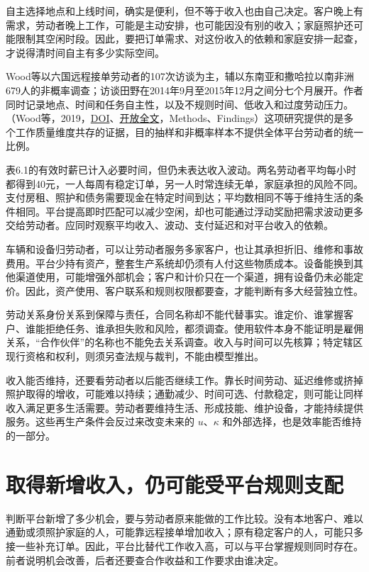 \documentclass[UTF8,fontset=windows,12pt,a4paper,oneside,openany]{ctexbook}
\begin{document}
自主选择地点和上线时间，确实是便利，但不等于收入也由自己决定。客户晚上有需求，劳动者晚上工作，可能是主动安排，也可能因没有别的收入；家庭照护还可能限制其空闲时段。因此，要把订单需求、对这份收入的依赖和家庭安排一起查，才说得清时间自主有多少实际空间。

Wood等以六国远程接单劳动者的107次访谈为主，辅以东南亚和撒哈拉以南非洲679人的非概率调查；访谈田野在2014年9月至2015年12月之间分七个月展开。作者同时记录地点、时间和任务自主性，以及不规则时间、低收入和过度劳动压力。（Wood等，2019，\href{https://doi.org/10.1177/0950017018785616}{DOI}、\href{https://pmc.ncbi.nlm.nih.gov/articles/PMC6380453/}{开放全文}，Methods、Findings）这项研究提供的是多个工作质量维度共存的证据，目的抽样和非概率样本不提供全体平台劳动者的统一比例。

表6.1的有效时薪已计入必要时间，但仍未表达收入波动。两名劳动者平均每小时都得到40元，一人每周有稳定订单，另一人时常连续无单，家庭承担的风险不同。支付房租、照护和债务需要现金在特定时间到达；平均数相同不等于维持生活的条件相同。平台提高即时匹配可以减少空闲，却也可能通过浮动奖励把需求波动更多交给劳动者。应同时观察平均收入、波动、支付延迟和对平台收入的依赖。

车辆和设备归劳动者，可以让劳动者服务多家客户，也让其承担折旧、维修和事故费用。平台少持有资产，整套生产系统却仍须有人付这些物质成本。设备能换到其他渠道使用，可能增强外部机会；客户和计价只在一个渠道，拥有设备仍未必能定价。因此，资产使用、客户联系和规则权限都要查，才能判断有多大经营独立性。

劳动关系身份关系到保障与责任，合同名称却不能代替事实。谁定价、谁掌握客户、谁能拒绝任务、谁承担失败和风险，都须调查。使用软件本身不能证明是雇佣关系，“合作伙伴”的名称也不能免去关系调查。收入与时间可以先核算；特定辖区现行资格和权利，则须另查法规与裁判，不能由模型推出。

收入能否维持，还要看劳动者以后能否继续工作。靠长时间劳动、延迟维修或挤掉照护取得的增收，可能难以持续；通勤减少、时间可选、付款稳定，则可能让同样收入满足更多生活需要。劳动者要维持生活、形成技能、维护设备，才能持续提供服务。这些再生产条件会反过来改变未来的 $u$、$\kappa$ 和外部选择，也是效率能否维持的一部分。

\section{取得新增收入，仍可能受平台规则支配}

判断平台新增了多少机会，要与劳动者原来能做的工作比较。没有本地客户、难以通勤或须照护家庭的人，可能靠远程接单增加收入；原有稳定客户的人，可能只多接一些补充订单。因此，平台比替代工作收入高，可以与平台掌握规则同时存在。前者说明机会改善，后者还要查合作收益和工作要求由谁决定。
\end{document}
